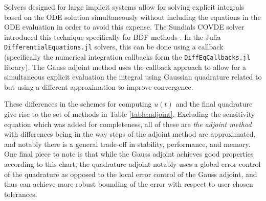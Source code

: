 Solvers designed for large implicit systems allow for solving explicit integrals based on the ODE solution simultaneously without including the equations in the ODE evaluation in order to avoid this expense. 
The Sundials COVDE solver introduced this technique specifically for BDF methods \cite{SUNDIALS-hindmarsh2005sundials}. 
In the Julia \texttt{DifferentialEquations.jl} solvers, this can be done using a callback (specifically the numerical integration callbacks form the \texttt{DiffEqCallbacks.jl} library). 
The Gauss adjoint method uses the callback approach to allow for a simultaneous explicit evaluation the integral using Gaussian quadrature related to \cite{Norcliffe_gaussquadrature_2023} but using a different approximation to improve convergence.

These differences in the schemes for computing $u(t)$ and the final quadrature give rise to the set of methods in Table \ref{table:adjoint}. 
Excluding the sensitivity equation which was added for completeness, all of these are \textit{the adjoint method} with differences being in the way steps of the adjoint method are approximated, and notably there is a general trade-off in stability, performance, and memory. 
One final piece to note is that while the Gauss adjoint achieves good properties according to this chart, the quadrature adjoint notably uses a global error control of the quadrature as opposed to the local error control of the Gauss adjoint, and thus can achieve more robust bounding of the error with respect to user chosen tolerances.

